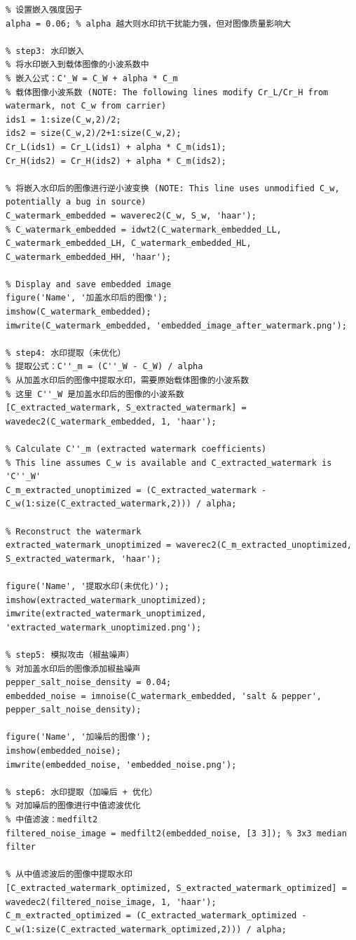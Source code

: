 \documentclass[12pt, a4paper]{article}
\begin{document}
\begin{small}
\begin{verbatim}
% 设置嵌入强度因子
alpha = 0.06; % alpha 越大则水印抗干扰能力强，但对图像质量影响大

% step3: 水印嵌入
% 将水印嵌入到载体图像的小波系数中
% 嵌入公式：C'_W = C_W + alpha * C_m
% 载体图像小波系数 (NOTE: The following lines modify Cr_L/Cr_H from watermark, not C_w from carrier)
ids1 = 1:size(C_w,2)/2;
ids2 = size(C_w,2)/2+1:size(C_w,2);
Cr_L(ids1) = Cr_L(ids1) + alpha * C_m(ids1);
Cr_H(ids2) = Cr_H(ids2) + alpha * C_m(ids2);

% 将嵌入水印后的图像进行逆小波变换 (NOTE: This line uses unmodified C_w, potentially a bug in source)
C_watermark_embedded = waverec2(C_w, S_w, 'haar');
% C_watermark_embedded = idwt2(C_watermark_embedded_LL, C_watermark_embedded_LH, C_watermark_embedded_HL, C_watermark_embedded_HH, 'haar');

% Display and save embedded image
figure('Name', '加盖水印后的图像');
imshow(C_watermark_embedded);
imwrite(C_watermark_embedded, 'embedded_image_after_watermark.png');

% step4: 水印提取（未优化）
% 提取公式：C''_m = (C''_W - C_W) / alpha
% 从加盖水印后的图像中提取水印，需要原始载体图像的小波系数
% 这里 C''_W 是加盖水印后的图像的小波系数
[C_extracted_watermark, S_extracted_watermark] = wavedec2(C_watermark_embedded, 1, 'haar');

% Calculate C''_m (extracted watermark coefficients)
% This line assumes C_w is available and C_extracted_watermark is 'C''_W'
C_m_extracted_unoptimized = (C_extracted_watermark - C_w(1:size(C_extracted_watermark,2))) / alpha;

% Reconstruct the watermark
extracted_watermark_unoptimized = waverec2(C_m_extracted_unoptimized, S_extracted_watermark, 'haar');

figure('Name', '提取水印(未优化)');
imshow(extracted_watermark_unoptimized);
imwrite(extracted_watermark_unoptimized, 'extracted_watermark_unoptimized.png');

% step5: 模拟攻击（椒盐噪声）
% 对加盖水印后的图像添加椒盐噪声
pepper_salt_noise_density = 0.04;
embedded_noise = imnoise(C_watermark_embedded, 'salt & pepper', pepper_salt_noise_density);

figure('Name', '加噪后的图像');
imshow(embedded_noise);
imwrite(embedded_noise, 'embedded_noise.png');

% step6: 水印提取（加噪后 + 优化）
% 对加噪后的图像进行中值滤波优化
% 中值滤波：medfilt2
filtered_noise_image = medfilt2(embedded_noise, [3 3]); % 3x3 median filter

% 从中值滤波后的图像中提取水印
[C_extracted_watermark_optimized, S_extracted_watermark_optimized] = wavedec2(filtered_noise_image, 1, 'haar');
C_m_extracted_optimized = (C_extracted_watermark_optimized - C_w(1:size(C_extracted_watermark_optimized,2))) / alpha;


\end{verbatim}
\end{small}
\end{document}

